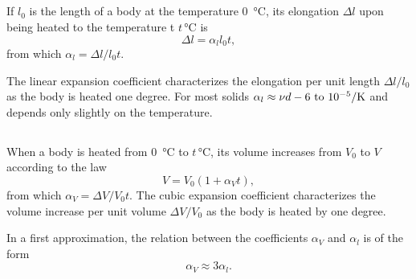 \subsection{}\label{40.2.2} If $l_{0}$ is the length of a body at the temperature \SI{0}{\degreeCelsius}, its elongation $\Delta l$ upon being heated to the temperature t $t \, \si{\degreeCelsius}$ is
\begin{equation*}%
\Delta l = \alpha_{l} l_{0} t,
\end{equation*}
from which $\alpha_{l} = \Delta l/l_{0} t$.

The linear expansion coefficient characterizes the elongation per unit length $\Delta l/l_{0}$ as the body is heated one degree. For most solids $\alpha_{l} \approx  \nu{d-6} \text{ to } \SI{d-5}{\per\kelvin}$ and depends only slightly on the temperature.

\subsection{}\label{40.2.3} When a body is heated from \SI{0}{\degreeCelsius} to $t \, \si{\degreeCelsius}$, its volume
increases from $V_{0}$ to $V$ according to the law
\begin{equation*}%
V = V_{0} (1 + \alpha_{V}t),
\end{equation*}
from which $\alpha_{V} = \Delta V/V_{0}t$. The cubic expansion coefficient characterizes the volume increase per unit volume $\Delta V/V_{0}$ as the body is heated by one degree.

In a first approximation, the relation between the coefficients $\alpha_{V}$ and $\alpha_{l}$ is of the form
\begin{equation*}%
\alpha_{V} \approx 3\alpha_{l}.
\end{equation*}

